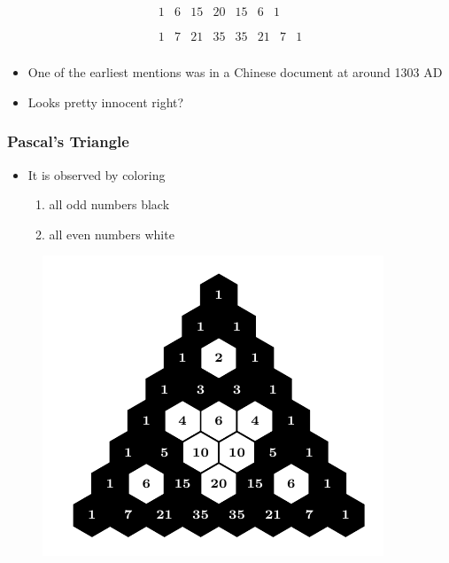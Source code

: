 \documentclass{beamer}
\begin{document}
\begin{frame}
\begin{equation*}
\begin{array}{c}
            \begin{array}{ccccccc}
             1 & 6 & 15 & 20 & 15 & 6 & 1 \\
            \end{array}
             \\
            \begin{array}{cccccccc}
             1 & 7 & 21 & 35 & 35 & 21 & 7 & 1 \\
            \end{array}
        \end{array}
    \end{equation*}
    \begin{itemize}
        \item
        One of the earliest mentions was in a Chinese document at around 1303 AD
        \item
        Looks pretty innocent right?
    \end{itemize}

\end{frame}
\begin{frame}
    \frametitle{Pascal's Triangle}
    \begin{itemize}
        \item It is observed by coloring 
        \begin{enumerate}
            \item all odd numbers black
            \item all even numbers white
        \end{enumerate}
    \end{itemize}
    \begin{figure}
        \centering
        \includegraphics[scale=0.8]{Mod2,7.pdf}
    \end{figure}
\end{frame}
\end{document}
